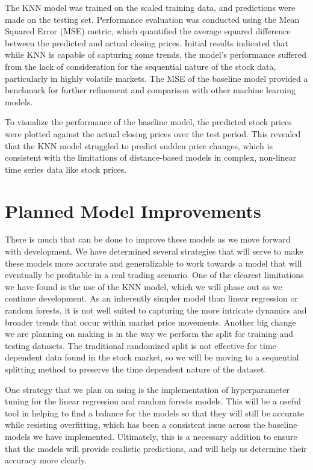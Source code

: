 \documentclass[conference]{IEEEtran}
\begin{document}
The KNN model was trained on the scaled training data, and predictions were made on the testing set. Performance evaluation was conducted using the Mean Squared Error (MSE) metric, which quantified the average squared difference between the predicted and actual closing prices. Initial results indicated that while KNN is capable of capturing some trends, the model's performance suffered from the lack of consideration for the sequential nature of the stock data, particularly in highly volatile markets. The MSE of the baseline model provided a benchmark for further refinement and comparison with other machine learning models.

To visualize the performance of the baseline model, the predicted stock prices were plotted against the actual closing prices over the test period. This revealed that the KNN model struggled to predict sudden price changes, which is consistent with the limitations of distance-based models in complex, non-linear time series data like stock prices.

\section{Planned Model Improvements}
There is much that can be done to improve these models as we move forward with development. We have determined several strategies that will serve to make these models more accurate and generalizable to work towards a model that will eventually be profitable in a real trading scenario. One of the clearest limitations we have found is the use of the KNN model, which we will phase out as we continue development. As an inherently simpler model than linear regression or random forests, it is not well suited to capturing the more intricate dynamics and broader trends that occur within market price movements. Another big change we are planning on making is in the way we perform the split for training and testing datasets. The traditional randomized split is not effective for time dependent data found in the stock market, so we will be moving to a sequential splitting method to preserve the time dependent nature of the dataset.

One strategy that we plan on using is the implementation of hyperparameter tuning for the linear regression and random forests models. This will be a useful tool in helping to find a balance for the models so that they will still be accurate while resisting overfitting, which has been a consistent issue across the baseline models we have implemented. Ultimately, this is a necessary addition to ensure that the models will provide realistic predictions, and will help us determine their accuracy more clearly. 
\end{document}
